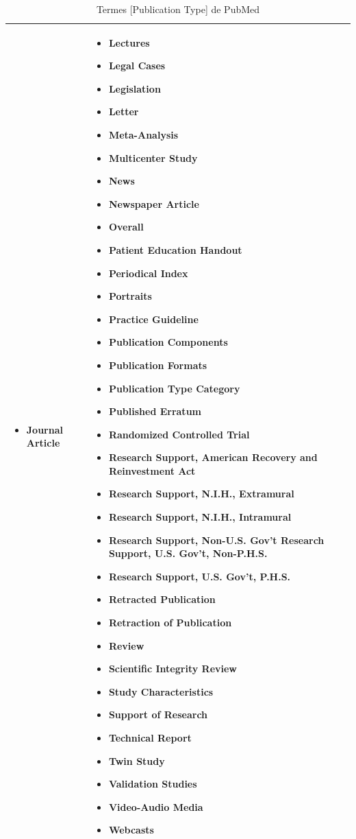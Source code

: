 \documentclass[11pt,twoside,a4paper]{article}
\begin{document}
\begin{table}[ht]
\begin{center}
\begin{tabular}{|p{}|p{}|}
\begin{itemize}
			\item \textbf{Journal Article}
		\end{itemize}	&
		\begin{itemize}
			\item Lectures
			\item Legal Cases
			\item \textbf{Legislation}
			\item Letter
			\item Meta-Analysis
			\item Multicenter Study
			\item News
			\item Newspaper Article
			\item Overall
			\item Patient Education Handout
			\item Periodical Index
			\item Portraits
			\item Practice Guideline
			\item Publication Components
			\item Publication Formats
			\item Publication Type Category
			\item Published Erratum
			\item \textbf{Randomized Controlled Trial}
			\item Research Support, American Recovery and Reinvestment Act
			\item Research Support, N.I.H., Extramural
			\item Research Support, N.I.H., Intramural
			\item Research Support, Non-U.S. Gov't Research Support, U.S. Gov't, Non-P.H.S.
			\item Research Support, U.S. Gov't, P.H.S.
			\item Retracted Publication
			\item Retraction of Publication
			\item \textbf{Review}
			\item Scientific Integrity Review
			\item Study Characteristics
			\item Support of Research
			\item \textbf{Technical Report}
			\item Twin Study
			\item Validation Studies
			\item Video-Audio Media
			\item Webcasts
		\end{itemize} \\
		\hline
		\end{tabular}
	\end{center}
	\caption{Termes [Publication Type] de PubMed}
	\label{tab:TabPubMedPublicationTypes}
\end{table}~\\
\end{document}
